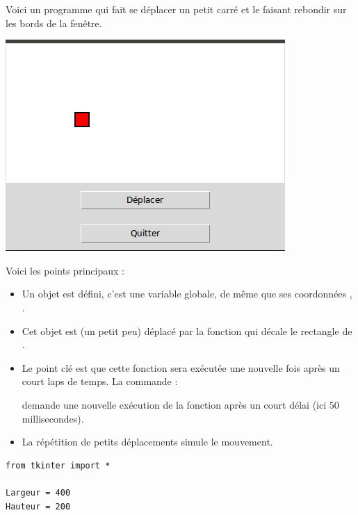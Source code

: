 \documentclass[11pt,class=report,crop=false]{standalone}
\begin{document}
\begin{cours}


Voici un programme qui fait se déplacer un petit carré et le faisant rebondir sur les bords de la fenêtre.

\begin{center}
\includegraphics[scale=\myscale,scale=0.5]{ecran-alea-cours-mouv}
\end{center}

Voici les points principaux :
\begin{itemize}
  \item Un objet  est défini, c'est une variable globale, de même que ses coordonnées , .
  
  \item Cet objet est (un petit peu) déplacé par la fonction  qui décale le rectangle de .
    
  \item Le point clé est que cette fonction sera exécutée une nouvelle fois après un court laps de temps. La commande :\\
  \centerline{}
  demande une nouvelle exécution de la fonction  après un court délai (ici $50$ millisecondes).
  
  \item La répétition de petits déplacements simule le mouvement.
\end{itemize}

\begin{lstlisting}
from tkinter import *

Largeur = 400
Hauteur = 200


\end{lstlisting}
\end{cours}
\end{document}
